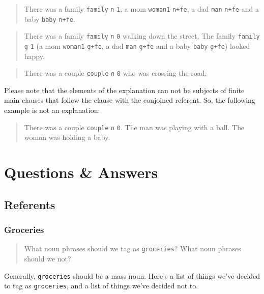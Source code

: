 \documentclass[
]{book}
\begin{document}
\begin{quote}
There was a family \texttt{family} \texttt{n} \texttt{1}, a mom \texttt{woman1} \texttt{n+fe}, a dad \texttt{man} \texttt{n+fe} and a baby \texttt{baby} \texttt{n+fe}.
\end{quote}

\begin{quote}
There was a family \texttt{family} \texttt{n} \texttt{0} walking down the street. The family \texttt{family} \texttt{g} \texttt{1} (a mom \texttt{woman1} \texttt{g+fe}, a dad \texttt{man} \texttt{g+fe} and a baby \texttt{baby} \texttt{g+fe}) looked happy.
\end{quote}

\begin{quote}
There was a couple \texttt{couple} \texttt{n} \texttt{0} who was crossing the road.
\end{quote}

Please note that the elements of the explanation can not be subjects of finite main clauses that follow the clause with the conjoined referent. So, the following example is not an explanation:

\begin{quote}
There was a couple \texttt{couple} \texttt{n} \texttt{0}. The man was playing with a ball. The woman was holding a baby.
\end{quote}

\hypertarget{questions-answers}{%
\chapter{Questions \& Answers}\label{questions-answers}}

\hypertarget{referents-1}{%
\section{Referents}\label{referents-1}}

\hypertarget{groceries}{%
\subsection{Groceries}\label{groceries}}

\begin{quote}
What noun phrases should we tag as \texttt{groceries}? What noun phrases should we not?
\end{quote}

Generally, \texttt{groceries} should be a mass noun.
Here's a list of things we've decided to tag as \texttt{groceries}, and a list of things we've decided not to.
\end{document}
